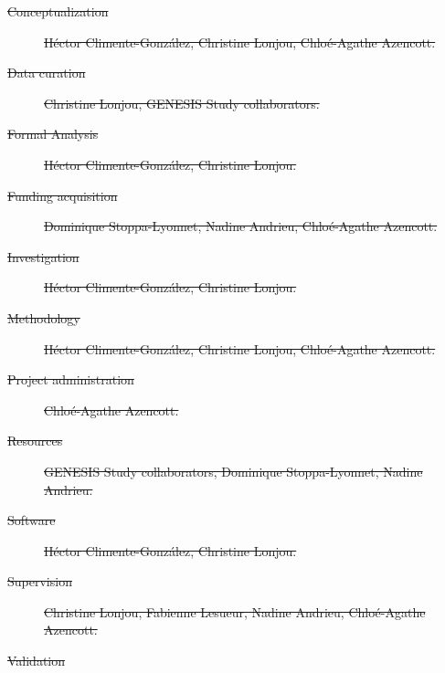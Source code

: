 \documentclass[10pt,letterpaper]{article}
\providecommand{\DIFdeltex}[1]{{\protect\color{red}\sout{#1}}}                      %
\providecommand{\DIFdel}[1]{\texorpdfstring{\DIFdeltex{#1}}{}} %
\begin{document}

\begin{description}%
\item[\DIFdel{Conceptualization}]%
\DIFdel{Héctor Climente-González, Christine Lonjou, Chloé-Agathe Azencott.
  }%
\item[\DIFdel{Data curation}]%
\DIFdel{Christine Lonjou, GENESIS Study collaborators.
  }%
\item[\DIFdel{Formal Analysis}]%
\DIFdel{Héctor Climente-González, Christine Lonjou.
  }%
\item[\DIFdel{Funding acquisition}]%
\DIFdel{Dominique Stoppa-Lyonnet, Nadine Andrieu, Chloé-Agathe Azencott.
  }%
\item[\DIFdel{Investigation}]%
\DIFdel{Héctor Climente-González, Christine Lonjou.
  }%
\item[\DIFdel{Methodology}]%
\DIFdel{Héctor Climente-González, Christine Lonjou, Chloé-Agathe Azencott.
  }%
\item[\DIFdel{Project administration}]%
\DIFdel{Chloé-Agathe Azencott.
  }%
\item[\DIFdel{Resources}]%
\DIFdel{GENESIS Study collaborators, Dominique Stoppa-Lyonnet, Nadine Andrieu.
  }%
\item[\DIFdel{Software}]%
\DIFdel{Héctor Climente-González, Christine Lonjou.
  }%
\item[\DIFdel{Supervision}]%
\DIFdel{Christine Lonjou, Fabienne Lesueur, Nadine Andrieu, Chloé-Agathe Azencott.
  }%
\item[\DIFdel{Validation}]%

\end{description}
\end{document}
